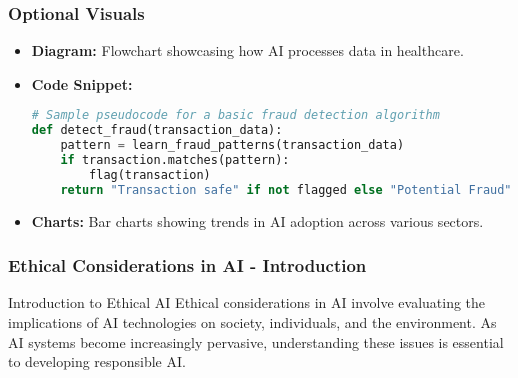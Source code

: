 \documentclass[aspectratio=169]{beamer}
\begin{document}
\begin{frame}[fragile]
    \frametitle{Optional Visuals}
    \begin{itemize}
        \item \textbf{Diagram:} Flowchart showcasing how AI processes data in healthcare.
        \item \textbf{Code Snippet:}
        \begin{lstlisting}[language=Python]
# Sample pseudocode for a basic fraud detection algorithm
def detect_fraud(transaction_data):
    pattern = learn_fraud_patterns(transaction_data)
    if transaction.matches(pattern):
        flag(transaction)
    return "Transaction safe" if not flagged else "Potential Fraud"
        \end{lstlisting}
        \item \textbf{Charts:} Bar charts showing trends in AI adoption across various sectors.
    \end{itemize}
\end{frame}

\begin{frame}[fragile]
    \frametitle{Ethical Considerations in AI - Introduction}
    \begin{block}{Introduction to Ethical AI}
        Ethical considerations in AI involve evaluating the implications of AI technologies on society, individuals, and the environment. As AI systems become increasingly pervasive, understanding these issues is essential to developing responsible AI.
    \end{block}
\end{frame}
\end{document}
